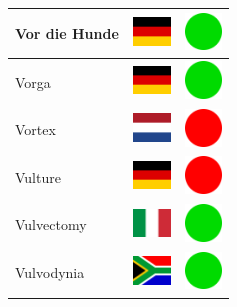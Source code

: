 \documentclass[12pt, a4paper, twoside]{report}
\begin{document}
\begin{center}
\begin{longtable}{|p{5cm}|p{2cm}|p{2cm}|}
 Vor die Hunde                                              & \includegraphics[width=1cm]{../4x3/de} &   \includegraphics[width=1cm]{../likes/y} \\ \hline
 Vorga                                                      & \includegraphics[width=1cm]{../4x3/de} &   \includegraphics[width=1cm]{../likes/y} \\ \hline
 Vortex                                                     & \includegraphics[width=1cm]{../4x3/nl} &   \includegraphics[width=1cm]{../likes/n} \\ \hline
 Vulture                                                    & \includegraphics[width=1cm]{../4x3/de} &   \includegraphics[width=1cm]{../likes/n} \\ \hline
 Vulvectomy                                                 & \includegraphics[width=1cm]{../4x3/it} &   \includegraphics[width=1cm]{../likes/y} \\ \hline
 Vulvodynia                                                 & \includegraphics[width=1cm]{../4x3/za} &   \includegraphics[width=1cm]{../likes/y} \\ \hline

\end{longtable}
\end{center}
\end{document}
